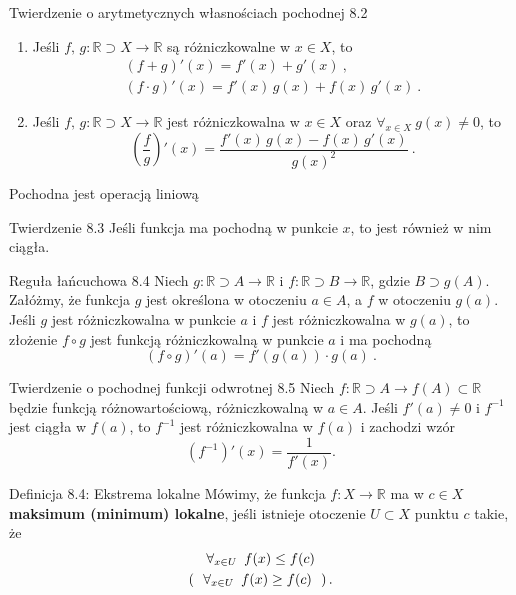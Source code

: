 \documentclass{article}
\newcommand{\hquad}{\mkern9mu}
\newcommand{\R}{\mathbb{R}}
\begin{document}
\begin{twier}{Twierdzenie o arytmetycznych własnościach pochodnej 8.2}
\begin{enumerate}[label=\Roman*.]
    \item Jeśli $f,\, g:\R\supset X\to\R$ są różniczkowalne w $x\in X$, to
    \begin{gather}
        (f+g)'(x)=f'(x)+g'(x)\ ,\\(f\cdot g)'(x)=f'(x)\,g(x)+f(x)\,g'(x)\ .
    \end{gather}
    \item Jeśli $f,\,g:\R\supset X\to\R$ jest różniczkowalna w $x\in X$ oraz $\forall_{x\in X}\ g(x)\neq 0$, to
    \begin{equation*}
        \left(\frac{f}{g}\right)'(x)=\frac{f'(x)\,g(x)-f(x)\,g'(x)}{g(x)^2}\ .
    \end{equation*}
\end{enumerate}
\end{twier}

Pochodna jest operacją liniową

\begin{twier}{Twierdzenie 8.3}
    Jeśli funkcja ma pochodną w punkcie $x$, to jest również w nim ciągła. 
\end{twier}

\begin{twier}{Reguła łańcuchowa 8.4}
Niech $g:\R\supset A\to\R$ i $f:\R\supset B\to\R$, gdzie $B\supset g(A)$.
Załóżmy, że funkcja $g$ jest określona w otoczeniu $a\in A$, a $f$ w otoczeniu $g(a)$.
Jeśli $g$ jest różniczkowalna w punkcie $a$ i $f$ jest różniczkowalna w $g(a)$, to złożenie
$f\circ g$ jest funkcją różniczkowalną w punkcie $a$ i ma pochodną
\begin{equation*}
    (f\circ g)'(a)=f'(g(a))\cdot g(a)\ .
\end{equation*}
\end{twier}

\begin{twier}{Twierdzenie o pochodnej funkcji odwrotnej 8.5}
    Niech $f:\R\supset A\to f(A)\subset \R$ będzie funkcją różnowartościową, różniczkowalną w $a\in A$.
    Jeśli $f'(a)\ne0$ i $f^{-1}$ jest ciągła w $f(a)$, to $f^{-1}$ jest różniczkowalna w $f(a)$ i zachodzi wzór
    \begin{equation*}
        \left( f^{-1} \right)'(x)=\frac{1}{f'(x)}.
    \end{equation*}
\end{twier}

\begin{defr}{Definicja 8.4: Ekstrema lokalne}
    Mówimy, że funkcja $f:X\to\R$ ma w $c\in X$ \textbf{maksimum (minimum) lokalne}, jeśli istnieje otoczenie $U\subset X$
    punktu $c$ takie, że 
    \begin{gather*}
        \forall_{x\in U}\hquad f(x)\le f(c)\\
        \left(\ \ \forall_{x\in U}\hquad f(x)\ge f(c)\ \ \right).
    \end{gather*}
\end{defr}
\end{document}

